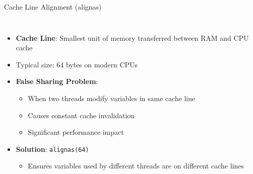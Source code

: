 \documentclass{beamer}
\begin{document}
\begin{frame}{Cache Line Alignment (alignas)}
\begin{columns}
\begin{itemize}
    \item \textbf{Cache Line}: Smallest unit of memory transferred between RAM and CPU cache
    \item Typical size: 64 bytes on modern CPUs
    \item \textbf{False Sharing Problem}:
    \begin{itemize}
        \item When two threads modify variables in same cache line
        \item Causes constant cache invalidation
        \item Significant performance impact
    \end{itemize}
    \item \textbf{Solution}: \texttt{alignas(64)}
    \begin{itemize}
        \item Ensures variables used by different threads are on different cache lines
    \end{itemize}
\end{itemize}

\end{columns}
\end{frame}
\end{document}
